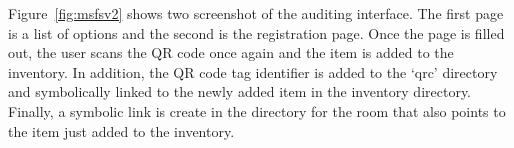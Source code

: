 
Figure~\ref{fig:msfsv2} shows two screenshot of the auditing interface.  The first page is a list of options and the second is
the registration page.  Once the page is filled out, the user scans the QR code once again and the item is added to the inventory.
In addition, the QR code tag identifier is added to the `qrc' directory and symbolically linked to the newly added item
in the inventory directory.  Finally, a symbolic link is create in the directory for the room that also points to the item
just added to the inventory.

